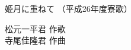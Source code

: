 \documentclass[10pt,b5j]{tarticle} %
\begin{document}
\begin{minipage}[c]{0.7\hsize} %
    \begin{center}
        {\LARGE
            姫月に重ねて %
        }
        {\small 
            （平成26年度寮歌） %
        }
    \end{center}
\end{minipage}
\begin{minipage}[c]{0.3\hsize} %
    \begin{flushright} %
        松元一平君 作歌\\寺尾佳隆君 作曲 %
    \end{flushright}
\end{minipage}
\end{document}
